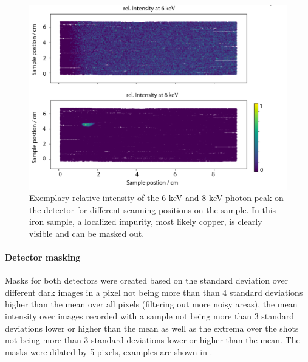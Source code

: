 \begin{figure}
	\centering
	\includegraphics[width=0.7\linewidth]{images/xrf.png}
	\caption[Exemplary relative intensity of the 6 keV and 8 keV photon peak on the detector for different scanning positions on the sample]{Exemplary relative intensity of the 6 keV and 8 keV photon peak on the detector for different scanning positions on the sample. In this iron sample, a localized impurity, most likely copper, is clearly visible and can be masked out.}
	\label{fig:xrf}
\end{figure}

\paragraph{Detector masking}
Masks for both detectors were created based on the standard deviation over different dark images in a pixel not being more than than 4 standard deviations higher than the mean over all pixels (filtering out more noisy areas), the mean intensity over images recorded with a sample not being more than 3 standard deviations lower or higher than the mean as well as the extrema over the shots not being more than 3 standard deviations lower or higher than the mean. The masks were dilated by 5 pixels, examples are shown in .

